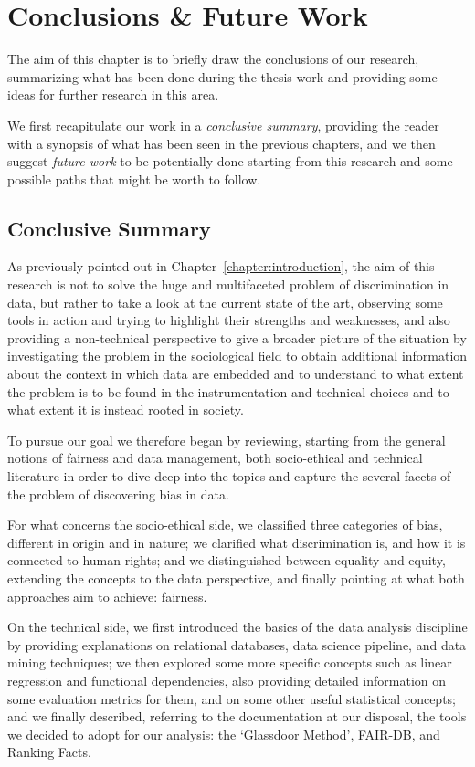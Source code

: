 \chapter{Conclusions \& Future Work}
\label{chapter:conclusions_future_work}
\thispagestyle{empty}

The aim of this chapter is to briefly draw the conclusions of our research, summarizing what has been done during the thesis work and providing some ideas for further research in this area.

We first recapitulate our work in a \textit{conclusive summary}, providing the reader with a synopsis of what has been seen in the previous chapters, and we then suggest \textit{future work} to be potentially done starting from this research and some possible paths that might be worth to follow.


\section{Conclusive Summary}
As previously pointed out in Chapter~\ref{chapter:introduction}, the aim of this research is not to solve the huge and multifaceted problem of discrimination in data, but rather to take a look at the current state of the art, observing some tools in action and trying to highlight their strengths and weaknesses, and also providing a non-technical perspective to give a broader picture of the situation by investigating the problem in the sociological field to obtain additional information about the context in which data are embedded and to understand to what extent the problem is to be found in the instrumentation and technical choices and to what extent it is instead rooted in society.

To pursue our goal we therefore began by reviewing, starting from the general notions of fairness and data management, both socio-ethical and technical literature in order to dive deep into the topics and capture the several facets of the problem of discovering bias in data.

For what concerns the socio-ethical side, we classified three categories of bias, different in origin and in nature; we clarified what discrimination is, and how it is connected to human rights; and we distinguished between equality and equity, extending the concepts to the data perspective, and finally pointing at what both approaches aim to achieve: fairness.

On the technical side, we first introduced the basics of the data analysis discipline by providing explanations on relational databases, data science pipeline, and data mining techniques; we then explored some more specific concepts such as linear regression and functional dependencies, also providing detailed information on some evaluation metrics for them, and on some other useful statistical concepts; and we finally described, referring to the documentation at our disposal, the tools we decided to adopt for our analysis: the `Glassdoor Method', FAIR-DB, and Ranking Facts.

